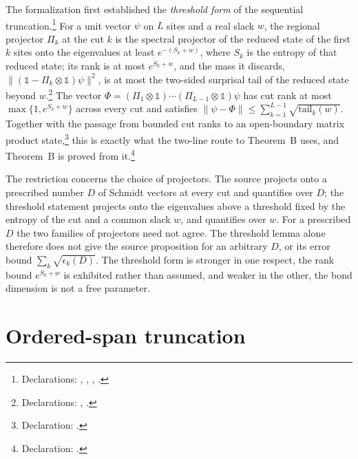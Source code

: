 \documentclass{article}
\begin{document}
The formalization first established the \emph{threshold form} of the sequential
truncation.\footnote{Declarations:
    ,
    ,
    ,
    .} For a unit vector
$\psi$ on $L$ sites and a real slack $w$, the regional projector $\Pi_k$ at
the cut $k$ is the spectral projector of the reduced state of the first $k$
sites onto the eigenvalues at least $e^{-(S_k+w)}$, where $S_k$ is the entropy
of that reduced state; its rank is at most $e^{S_k+w}$, and the mass it
discards, $\|(\mathbb 1-\Pi_k\otimes\mathbb 1)\psi\|^2$, is at most the
two-sided surprisal tail of the reduced state beyond $w$.\footnote{Declarations:
    ,
    .}
The vector $\Phi=(\Pi_1\otimes\mathbb 1)\cdots(\Pi_{L-1}\otimes\mathbb 1)\psi$
has cut rank at most $\max\{1,e^{S_k+w}\}$ across every cut and satisfies
$\|\psi-\Phi\|\le\sum_{k=1}^{L-1}\sqrt{\mathrm{tail}_k(w)}$. Together with the
passage from bounded cut ranks to an open-boundary matrix product
state,\footnote{Declaration:
    .} this is exactly
what the two-line route to Theorem~B uses, and Theorem~B is proved from
it.\footnote{Declaration:
    .}

The restriction concerns the choice of projectors. The source projects onto a
prescribed number $D$ of Schmidt vectors at every cut and quantifies over
$D$; the threshold statement projects onto the eigenvalues above a threshold
fixed by the entropy of the cut and a common slack $w$, and quantifies over
$w$. For a prescribed $D$ the two families of projectors need not agree.
The threshold lemma alone therefore does not give the source proposition
for an arbitrary $D$, or its error bound $\sum_k\sqrt{\epsilon_k(D)}$.
The threshold form is
stronger in one respect, the rank bound $e^{S_k+w}$ is exhibited rather than
assumed, and weaker in the other, the bond dimension is not a free parameter.

\section{Ordered-span truncation}
\end{document}
